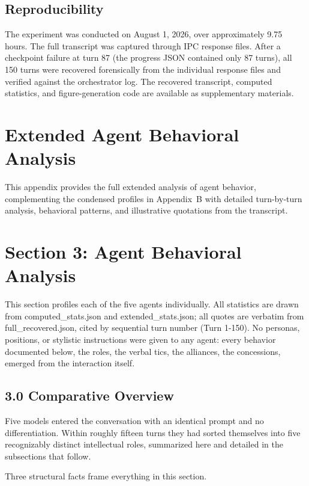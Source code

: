 \documentclass[sigconf,nonacm=true]{acmart}
\begin{document}
\subsection{Reproducibility}

The experiment was conducted on August 1, 2026, over approximately 9.75 hours. The full transcript was captured through IPC response files. After a checkpoint failure at turn 87 (the progress JSON contained only 87 turns), all 150 turns were recovered forensically from the individual response files and verified against the orchestrator log. The recovered transcript, computed statistics, and figure-generation code are available as supplementary materials.

\section{Extended Agent Behavioral Analysis}
\label{app:agent_analysis}

This appendix provides the full extended analysis of agent behavior, complementing the condensed profiles in Appendix~B with detailed turn-by-turn analysis, behavioral patterns, and illustrative quotations from the transcript.

\section{Section 3: Agent Behavioral Analysis}

This section profiles each of the five agents individually. All statistics are drawn from computed\_stats.json and extended\_stats.json; all quotes are verbatim from full\_recovered.json, cited by sequential turn number (Turn 1-150). No personas, positions, or stylistic instructions were given to any agent: every behavior documented below,  the roles, the verbal tics, the alliances, the concessions,  emerged from the interaction itself.

\subsection{3.0 Comparative Overview}

Five models entered the conversation with an identical prompt and no differentiation. Within roughly fifteen turns they had sorted themselves into five recognizably distinct intellectual roles, summarized here and detailed in the subsections that follow.

Three structural facts frame everything in this section.
\end{document}

